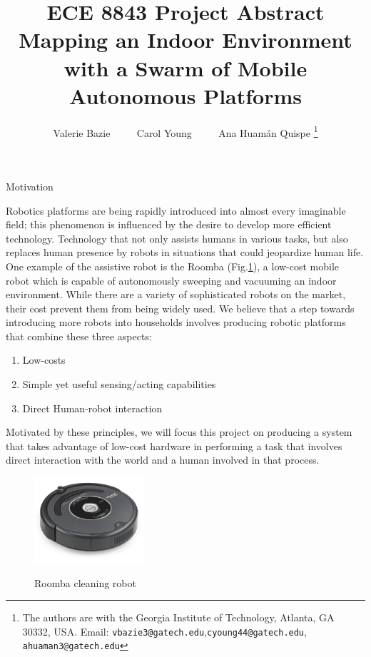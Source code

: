 \documentclass[conference]{IEEEtran}
\author{ Valerie Bazie $\quad\quad$ Carol Young $\quad\quad$ Ana Huam\'an Quispe%
	\thanks{The authors are with the Georgia Institute of
	Technology, Atlanta, GA 30332, USA. Email:
	{\tt\small vbazie3@gatech.edu},{\tt\small cyoung44@gatech.edu},
	{\tt\small ahuaman3@gatech.edu} }}
\title{ {ECE 8843} {P}roject {A}bstract  \\ {M}apping an Indoor Environment with a {S}warm of {M}obile {A}utonomous {P}latforms }
\makeatletter
\renewcommand\section{\@startsection{section}{1}{\z@}
                                  {-3.0ex plus -1.5ex minus -0.5ex}
                                  {0.7ex plus 1ex minus 0ex}
                                  {\bfseries}}
\makeatother
\begin{document}
\maketitle
\section{Motivation}

Robotics platforms are being rapidly introduced into almost every imaginable field; this phenomenon is influenced by the desire to develop more efficient technology. Technology that not only assists humans in various tasks, but also replaces human presence by robots in situations that could jeopardize human life. One example of the assistive robot is the
Roomba (Fig.\ref{fig:Roomba}), a low-cost mobile robot which is capable of
autonomously sweeping and vacuuming an indoor environment. 
While there are a variety of sophisticated robots on
the market, their cost prevent them from being widely 
used. We believe that a step towards introducing
more robots into households involves producing robotic
platforms that combine these three aspects: 

\begin{enumerate}
\item{ Low-costs } 
\item{ Simple yet useful sensing/acting capabilities }
\item{ Direct Human-robot interaction }
\end{enumerate}

Motivated by these principles, we will focus this project on
producing a system that takes advantage of low-cost
hardware in performing a task that involves direct interaction
with the world and a human involved in that process.

\begin{figure}[h]
	\centering
	\includegraphics[height=90pt]{images/roomba560_sideview.jpg} 
	\label{fig:Roomba}
    \caption{Roomba cleaning robot}
\end{figure}
\end{document}
